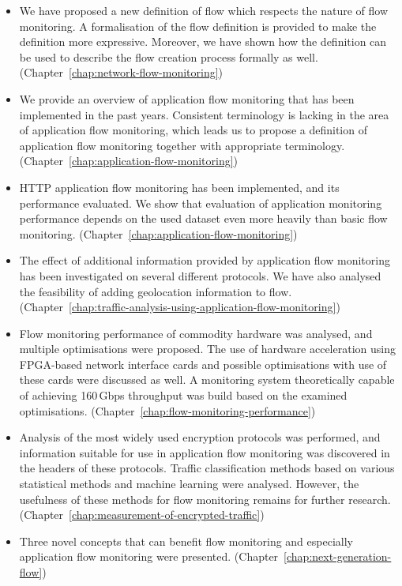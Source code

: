 \begin{itemize}
    \item We have proposed a new definition of flow which respects the nature of flow monitoring. A formalisation of the flow definition is provided to make the definition more expressive. Moreover, we have shown how the definition can be used to describe the flow creation process formally as well. (Chapter~\ref{chap:network-flow-monitoring})
    \item We provide an overview of application flow monitoring that has been implemented in the past years. Consistent terminology is lacking in the area of application flow monitoring, which leads us to propose a definition of application flow monitoring together with appropriate terminology. (Chapter~\ref{chap:application-flow-monitoring})
    \item HTTP application flow monitoring has been implemented, and its performance evaluated. We show that evaluation of application monitoring performance depends on the used dataset even more heavily than basic flow monitoring. (Chapter~\ref{chap:application-flow-monitoring})
    \item The effect of additional information provided by application flow monitoring has been investigated on several different protocols. We have also analysed the feasibility of adding geolocation information to flow. (Chapter~\ref{chap:traffic-analysis-using-application-flow-monitoring})
    \item Flow monitoring performance of commodity hardware was analysed, and multiple optimisations were proposed. The use of hardware acceleration using FPGA-based network interface cards and possible optimisations with use of these cards were discussed as well. A monitoring system theoretically capable of achieving 160\,Gbps throughput was build based on the examined optimisations. (Chapter~\ref{chap:flow-monitoring-performance})
    \item Analysis of the most widely used encryption protocols was performed, and information suitable for use in application flow monitoring was discovered in the headers of these protocols. Traffic classification methods based on various statistical methods and machine learning were analysed. However, the usefulness of these methods for flow monitoring remains for further research. (Chapter~\ref{chap:measurement-of-encrypted-traffic})
    \item Three novel concepts that can benefit flow monitoring and especially application flow monitoring were presented. (Chapter~\ref{chap:next-generation-flow})
\end{itemize}

